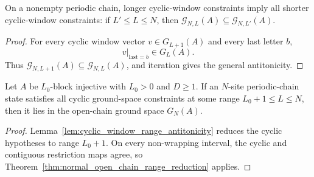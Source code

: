 \begin{lemma}%
    \label{lem:cyclic_window_range_antitonicity}
    \leanok
    On a nonempty periodic chain, longer cyclic-window constraints imply all
    shorter cyclic-window constraints: if $L' \le L \le N$, then
    $\mathcal G_{N,L}(A) \subseteq \mathcal G_{N,L'}(A)$.
\end{lemma}

\begin{proof}
    \leanok
    For every cyclic window vector $v\in G_{L+1}(A)$ and every last letter $b$,
    \[
        v|_{\mathrm{last}=b}\in G_L(A).
    \]
    Thus $\mathcal G_{N,L+1}(A)\subseteq\mathcal G_{N,L}(A)$, and iteration
    gives the general antitonicity.
\end{proof}

\begin{theorem}%
    \label{thm:cyclic_normal_open_chain_range_reduction}
    \leanok
    Let $A$ be $L_0$-block injective with $L_0>0$ and $D \ge 1$.
    If an $N$-site periodic-chain state satisfies all cyclic ground-space
    constraints at some range $L_0+1 \le L \le N$, then it lies in the
    open-chain ground space $G_N(A)$.
\end{theorem}

\begin{proof}
    \leanok
    Lemma~\ref{lem:cyclic_window_range_antitonicity} reduces the cyclic
    hypotheses to range $L_0+1$. On every non-wrapping interval, the cyclic and
    contiguous restriction maps agree, so
    Theorem~\ref{thm:normal_open_chain_range_reduction} applies.
\end{proof}
